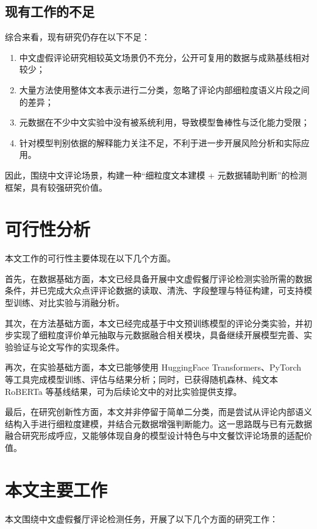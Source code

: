 \documentclass[UTF8,oneside,openright,fontset=none]{ctexbook}
\numberwithin{equation}{chapter}
\begin{document}
\subsection{现有工作的不足}
综合来看，现有研究仍存在以下不足：
\begin{enumerate}
  \item 中文虚假评论研究相较英文场景仍不充分，公开可复用的数据与成熟基线相对较少；
  \item 大量方法使用整体文本表示进行二分类，忽略了评论内部细粒度语义片段之间的差异；
  \item 元数据在不少中文实验中没有被系统利用，导致模型鲁棒性与泛化能力受限；
  \item 针对模型判别依据的解释能力关注不足，不利于进一步开展风险分析和实际应用。
\end{enumerate}

因此，围绕中文评论场景，构建一种“细粒度文本建模 + 元数据辅助判断”的检测框架，具有较强研究价值。

\section{可行性分析}
本文工作的可行性主要体现在以下几个方面。

首先，在数据基础方面，本文已经具备开展中文虚假餐厅评论检测实验所需的数据条件，并已完成大众点评评论数据的读取、清洗、字段整理与特征构建，可支持模型训练、对比实验与消融分析。

其次，在方法基础方面，本文已经完成基于中文预训练模型的评论分类实验，并初步实现了细粒度评价单元抽取与元数据融合相关模块，具备继续开展模型完善、实验验证与论文写作的实现条件。

再次，在实验基础方面，本文已能够使用 HuggingFace Transformers、PyTorch 等工具完成模型训练、评估与结果分析；同时，已获得随机森林、纯文本 RoBERTa 等基线结果，可为后续论文中的对比实验提供支撑。

最后，在研究创新性方面，本文并非停留于简单二分类，而是尝试从评论内部语义结构入手进行细粒度建模，并结合元数据增强判断能力。这一思路既与已有元数据融合研究形成呼应，又能够体现自身的模型设计特色与中文餐饮评论场景的适配价值。

\section{本文主要工作}
本文围绕中文虚假餐厅评论检测任务，开展了以下几个方面的研究工作：
\end{document}
